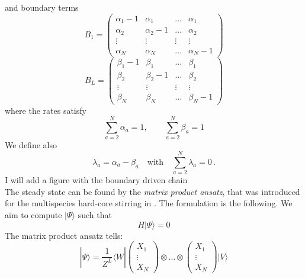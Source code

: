 \documentclass[11pt]{article}
\numberwithin{equation}{section}
\begin{document}
and boundary terms 
\begin{equation}
	B_{1}=\begin{pmatrix}
		\alpha_{1}-1&\alpha_{1}&\ldots&\alpha_{1}\\
		\alpha_{2}&\alpha_{2}-1&\ldots&\alpha_{2}\\
		\vdots&\vdots&\vdots&\vdots\\
		\alpha_{N}&\alpha_{N}&\ldots&\alpha_{N}-1
	\end{pmatrix}
\end{equation}
\begin{equation}
	B_{L}=\begin{pmatrix}
		\beta_{1}-1&\beta_{1}&\ldots&\beta_{1}\\
		\beta_{2}&\beta_{2}-1&\ldots&\beta_{2}\\
		\vdots&\vdots&\vdots&\vdots\\
		\beta_{N}&\beta_{N}&\ldots&\beta_{N}-1
	\end{pmatrix}
\end{equation}
where the rates satisfy
\begin{equation}\label{ratesConditions}
	\sum_{a=2}^{N}\alpha_{a}=1,\qquad\sum_{a=2}^{N}\beta_{a}=1
\end{equation} 
We define also 
\begin{equation}\label{lambdaConditions}
	\lambda_{a}=\alpha_{a}-\beta_{a}\quad\text{with}\quad \sum_{a=2}^{N}\lambda_{a}=0\,.
\end{equation}
{\color{red} I will add a figure with the boundary driven chain}\\
The steady state can be found by the \textit{matrix product ansatz}, that was introduced for the multispecies hard-core stirring in \cite{vanicat2017exact}. The formulation is the following. We aim to compute $|\Psi\rangle$ such that 
\begin{equation}
	H|\Psi\rangle =0
\end{equation}
The matrix product ansatz tells:
\begin{equation}
	|\Psi\rangle=\frac{1}{Z^{L}}\langle W|\begin{pmatrix}
		X_{1}\\
		\vdots\\
		X_{N}
	\end{pmatrix}\otimes \ldots\otimes \begin{pmatrix}
		X_{1}\\
		\vdots\\
		X_{N}
	\end{pmatrix}|V\rangle
\end{equation}
\end{document}
